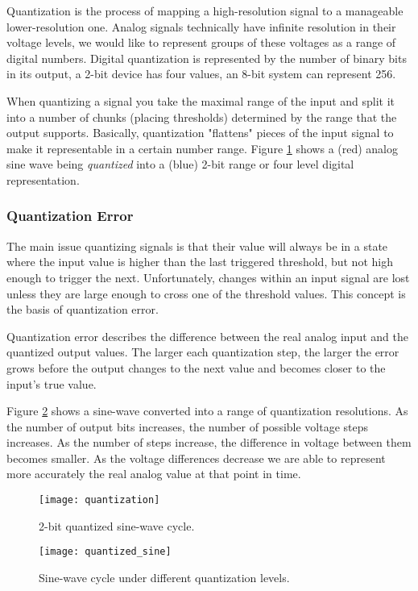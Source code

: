\documentclass[11pt,fleqn]{book} %
\begin{document}
Quantization is the process of mapping a high-resolution signal to a manageable lower-resolution one. Analog signals technically have infinite resolution in their voltage levels, we would like to represent groups of these voltages as a range of digital numbers. Digital quantization is represented by the number of binary bits in its output, a 2-bit device has four values, an 8-bit system can represent 256. 

When quantizing a signal you take the maximal range of the input and split it into a number of chunks (placing thresholds) determined by the range that the output supports. Basically, quantization "flattens" pieces of the input signal to make it representable in a certain number range. Figure \ref{quantization} shows a (red) analog sine wave being \textit{quantized} into a (blue) 2-bit range or four level digital representation.  


\subsubsection{Quantization Error}
The main issue quantizing signals is that their value will always be in a state where the input value is higher than the last triggered threshold, but not high enough to trigger the next. Unfortunately, changes within an input signal are lost unless they are large enough to cross one of the threshold values. This concept is the basis of quantization error. 

Quantization error describes the difference between the real analog input and the quantized output values. The larger each quantization step, the larger the error grows before the output changes to the next value and becomes closer to the input's true value. 

Figure \ref{quantized_sine} shows a sine-wave converted into a range of quantization resolutions. As the number of output bits increases, the number of possible voltage steps increases. As the number of steps increase, the difference in voltage between them becomes smaller. As the voltage differences decrease we are able to represent more accurately the real analog value at that point in time.

\begin{figure}[]
    \centering\texttt{[image: quantization]}
    \caption{2-bit quantized sine-wave cycle.}
    \label{quantization}
\end{figure}

\begin{figure}[]
    \centering\texttt{[image: quantized\_sine]}
    \caption{Sine-wave cycle under different quantization levels.}
    \label{quantized_sine}
\end{figure}
\end{document}
